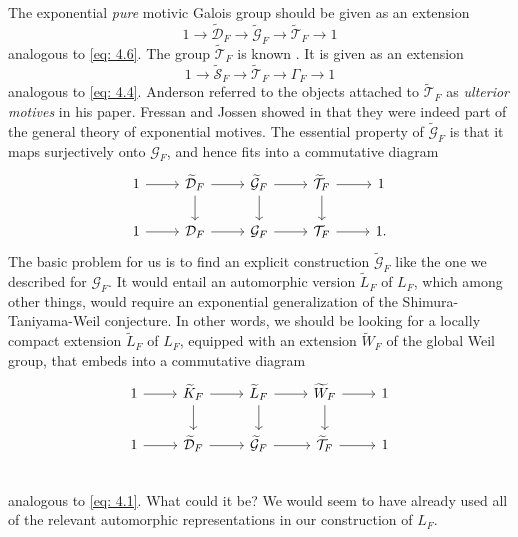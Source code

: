 \documentclass[preprint,12pt, leqno]{elsarticle}
\newcommand{\UGal}{\mathcal{G}_F}
\newcommand{\ubf}[1]{\textit{#1}}
\numberwithin{equation}{section}
\theoremstyle{named}
\begin{document}
The exponential \ubf{pure} motivic Galois group should be given as an extension
\begin{equation}\label{eq: 6.4}
    1 \longrightarrow \widetilde{\mathcal{D}}_F\longrightarrow \widetilde{\mathcal{G}}_F \longrightarrow \widetilde{\mathcal{T}}_F \longrightarrow 1
\end{equation}
analogous to \eqref{eq: 4.6}. The group $\widetilde{\mathcal{T}}_F$ is known \cite{Ander}. It is given as an extension
\begin{equation*}
    1 \longrightarrow \widetilde{\mathcal{S}}_F\longrightarrow \widetilde{\mathcal{T}}_F \longrightarrow \Gamma_F \longrightarrow 1
\end{equation*}
analogous to \eqref{eq: 4.4}. Anderson referred to the objects attached to $\widetilde{\mathcal{T}}_F$ as \ubf{ulterior motives} in his paper. Fressan and Jossen showed in \cite{FJ} that they were indeed part of the general theory of exponential motives. The essential property of $\widetilde{\mathcal{G}}_F$ is that it maps surjectively onto $\mathcal{G}_F$, and hence fits into a commutative diagram
\begin{equation*}
  \begin{tikzcd}
      1 \ar[r] &\widetilde{\mathcal{D}}_F\ar[r]\ar[d]  &\widetilde{\mathcal{G}}_F \ar[r]\ar[d] &\widetilde{\mathcal{T}}_F \ar[r]\ar[d]  &1\\
      1 \ar[r] &\mathcal{D}_F\ar[r]  &\mathcal{G}_F\ar[r] &\mathcal{T}_F \ar[r]  &1.
  \end{tikzcd} 
\end{equation*}
The basic problem for us is to find an explicit construction $\widetilde{\mathcal{G}}_F$ like the one we described for $\UGal$. It would entail an automorphic version $\widetilde{L}_F$ of $L_F$, which among other things, would require an exponential generalization of the Shimura-Taniyama-Weil conjecture. In other words, we should be looking for a locally compact extension $\widetilde{L}_F$ of $L_F$, equipped with an extension $\widetilde{W}_F$ of the global Weil group, that embeds into a commutative diagram
\begin{equation*}
    \begin{tikzcd}
        1 \ar[r] & \widetilde{K}_F \ar[d] \ar[r] & \widetilde{L}_F \ar[d] \ar[r] & \widetilde{W}_F \ar[d]\ar[r] & 1\\
        1 \ar[r] &\widetilde{\mathcal{D}}_F\ar[r]  &\widetilde{\mathcal{G}}_F \ar[r] &\widetilde{\mathcal{T}}_F \ar[r]  &1\\
    \end{tikzcd}
\end{equation*}
analogous to \eqref{eq: 4.1}. What could it be? We would seem to have already used all of the relevant automorphic representations in our construction of $L_F$.
\end{document}
